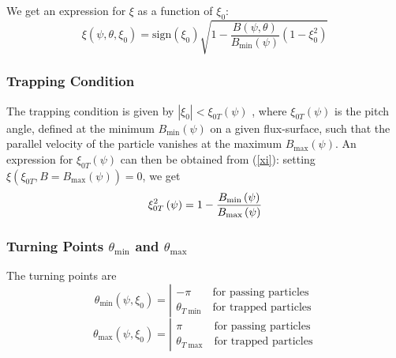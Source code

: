 \documentclass{article}
\begin{document}
We get an expression for $\xi $ as a function of $\xi _{0}$: 
\begin{equation}
\xi \left( \psi ,\theta ,\xi _{0}\right) = \text{sign}\left( \xi _{0}\right) 
\sqrt{1-\frac{B\left( \psi ,\theta \right) }{B_{\min }\left( \psi \right) }%
\left( 1-\xi _{0}^{2}\right) }  \label{xi}
\end{equation}

\subsubsection{Trapping Condition}

The trapping condition is given by $\left| \xi _{0}\right| <\xi _{0T}\left(
\psi \right) $ , where $\xi _{0T}\left( \psi \right) $ is the pitch angle,
defined at the minimum $B_{\min }\left( \psi \right) $ on a given
flux-surface, such that the parallel velocity of the particle vanishes at
the maximum $B_{\max }\left( \psi \right) $. An expression for $\xi
_{0T}\left( \psi \right) $ can then be obtained from (\ref{xi}): setting $%
\xi \left( \xi _{0T},B=B_{\max }\left( \psi \right) \right) =0$, we get 
\begin{equation}
\xi _{0T}^{2}\left( \psi \right) =1-\frac{B_{\min }\left( \psi \right) }{%
B_{\max }\left( \psi \right) }
\end{equation}

\subsubsection{Turning Points $\theta _{\min }$ and $\theta _{\max }$}

The turning points are 
\begin{equation}
\theta _{\min }\left( \psi ,\xi _{0}\right) =\left| 
\begin{array}{cc}
-\pi & \text{for passing particles} \\ 
\theta _{T\min } & \text{for trapped particles}
\end{array}
\right.
\end{equation}
\begin{equation}
\theta _{\max }\left( \psi ,\xi _{0}\right) =\left| 
\begin{array}{cc}
\pi & \text{for passing particles} \\ 
\theta _{T\max } & \text{for trapped particles}
\end{array}
\right.
\end{equation}
\end{document}
